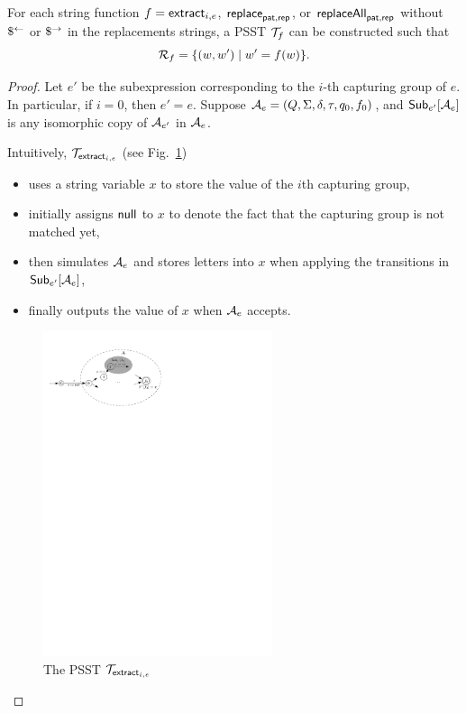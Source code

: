     \begin{lemma}
        For each string function $f = \mathsf{extract}_{i,e}$, $\mathsf{replace}_{\mathsf{pat}, \mathsf{rep}}$, or $\mathsf{replaceAll}_{\mathsf{pat}, \mathsf{rep}}$ without $\$^{\leftarrow}$ or $\$^{\rightarrow}$ in the replacements strings, a PSST $\mathcal{T}_f$ can be constructed such that
        $$\mathcal{R}_{f} = \{(w, w') \mid w'= f(w)\}.$$
    \end{lemma}
    \begin{proof}
        Let $e'$ be the subexpression corresponding to the $i$-th capturing group of $e$. In particular, if $i=0$, then $e' = e$.
        Suppose $\mathcal{A}_e = (Q, \Sigma, \delta, \tau, q_0, f_0)$, and ${\sf Sub}_{e'}[\mathcal{A}_e]$ is any isomorphic copy of $\mathcal{A}_{e'}$ in $\mathcal{A}_e$.

        Intuitively, $\mathcal{T}_{\mathsf{extract}_{i,e}}$ (see Fig.~\ref{fig-psst-extract})
        \begin{itemize}
            \item uses a string variable $x$ to store the value of the $i$th capturing group,
            \item initially assigns $\mathsf{null}$ to $x$ to denote the fact that the capturing group is not matched yet,
            \item then simulates $\mathcal{A}_e$ and stores letters into $x$ when applying the transitions in ${\sf Sub}_{e'}[\mathcal{A}_e]$,
            \item finally outputs the value of $x$ when $\mathcal{A}_e$ accepts.
        \end{itemize}

        \begin{figure}[ht]
            \centering
            \includegraphics[width = 0.6\textwidth]{psst-extract.pdf}
            \caption{The PSST $\mathcal{T}_{\mathsf{extract}_{i,e}}$}
            \label{fig-psst-extract}
        \end{figure}


\end{proof}
